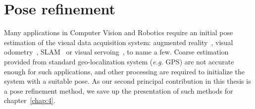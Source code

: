 \section{Pose refinement}


Many applications in Computer Vision and Robotics require an initial pose estimation of the visual data acquisition system: augmented reality~\citep{Arth2015}, visual odometry~\citep{Pascoe2015a}, SLAM~\citep{Milford2012} or visual servoing~\citep{Marchand2016}, to name a few. Coarse estimation provided from standard geo-localization system (\textit{e.g.} GPS) are not accurate enough for such applications, and other processing are required to initialize the system with a suitable pose. As our second principal contribution in this thesis is a pose refinement method, we save up the presentation of such methods for chapter~\ref{chap:4}.
